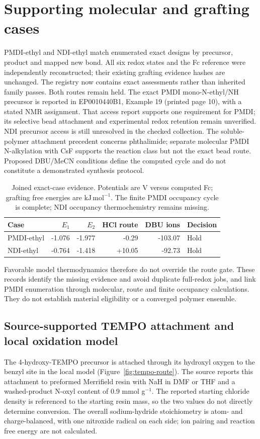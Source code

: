 \documentclass[11pt]{article}
\newcommand{\kj}{\ensuremath{\mathrm{kJ\,mol^{-1}}}}
\begin{document}
\section{Supporting molecular and grafting cases}
PMDI-ethyl and NDI-ethyl match enumerated exact designs by precursor, product and mapped new bond. All six redox states and the Fc reference were independently reconstructed; their existing grafting evidence hashes are unchanged. The registry now contains exact assessments rather than inherited family passes. Both routes remain held. The exact PMDI mono-N-ethyl/NH precursor is reported in EP0010440B1, Example 19 (printed page 10), with a stated NMR assignment.\cite{bochis1983} That access report supports one requirement for PMDI; its selective bead attachment and experimental redox retention remain unverified. NDI precursor access is still unresolved in the checked collection. The soluble-polymer attachment precedent concerns phthalimide; separate molecular PMDI N-alkylation with CsF supports the reaction class but not the exact bead route.\cite{hamilton1998} Proposed DBU/MeCN conditions define the computed cycle and do not constitute a demonstrated synthesis protocol.
\begin{table}[htbp]\centering
\caption{Joined exact-case evidence. Potentials are V versus computed Fc; grafting free energies are \kj. The finite PMDI occupancy cycle is complete; NDI occupancy thermochemistry remains missing.}
\begin{tabular}{lrrrrl}\toprule
Case & $E_1$ & $E_2$ & HCl route & DBU ions & Decision\\\midrule
PMDI-ethyl & -1.076 & -1.977 & -0.29 & -103.07 & Hold\\
NDI-ethyl & -0.764 & -1.418 & +10.05 & -92.73 & Hold\\\bottomrule
\end{tabular}\end{table}
Favorable model thermodynamics therefore do not override the route gate. These records identify the missing evidence and avoid duplicate full-redox jobs, and link PMDI enumeration through molecular, route and finite occupancy calculations. They do not establish material eligibility or a converged polymer ensemble.

\subsection{Source-supported TEMPO attachment and local oxidation model}
The 4-hydroxy-TEMPO precursor is attached through its hydroxyl oxygen to the benzyl site in the local model (Figure~\ref{fig:tempo-route}). The source reports this attachment to preformed Merrifield resin with NaH in DMF or THF and a washed-product N-oxyl content of 0.9 mmol g$^{-1}$.\cite{sommerlade2002tempo} The reported starting chloride density is referenced to the starting resin mass, so the two values do not directly determine conversion. The overall sodium-hydride stoichiometry is atom- and charge-balanced, with one nitroxide radical on each side; ion pairing and reaction free energy are not calculated.
\end{document}
